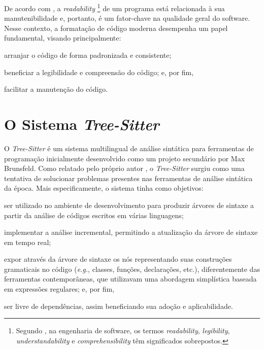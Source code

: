 \documentclass[11pt, a4paper, english, openright, twoside, brazil]{abntex2}
\begin{document}
  De acordo com \textcite{buse-2009-learning}, a \textit{readability}%
  \footnote
    { Segundo \textcite{oliveira-2020-evaluating}, na engenharia de software,
      os termos \textit{readability}, \textit{legibility},
      \textit{understandability} e \textit{comprehensibility} têm significados
      sobrepostos.}
  de um programa está relacionada à sua manutenibilidade e, portanto, é um
  fator-chave na qualidade geral do software.
  Nesse contexto, a formatação de código moderna desempenha um papel
  fundamental, visando principalmente:
  \begin{inparaenum}
    \item arranjar o código de forma padronizada e consistente;
    \item beneficiar a legibilidade e compreensão do código; e, por fim,
    \item facilitar a manutenção do código.
  \end{inparaenum}


  \chapter{O Sistema \textit{Tree-Sitter}}

  O \textit{Tree-Sitter} é um sistema multilingual de análise sintática para
  ferramentas de programação inicialmente desenvolvido como um projeto
  secundário por Max Brunsfeld. Como relatado pelo próprio autor
  \cite{github-2017-tree}, o \textit{Tree-Sitter} surgiu como uma tentativa de
  solucionar problemas presentes nas ferramentas de análise sintática da época.
  Mais especificamente, o sistema tinha como objetivos:
  \begin{inparaenum}
    \item ser utilizado no ambiente de desenvolvimento para produzir árvores de
          sintaxe a partir da análise de códigos escritos em várias linguagens;
    \item implementar a análise incremental, permitindo a atualização da árvore
          de sintaxe em tempo real;
    \item expor através da árvore de sintaxe os nós representando suas
          construções gramaticais no código (\textit{e.g.}, classes, funções,
          declarações, etc.), diferentemente das ferramentas contemporâneas,
          que utilizavam uma abordagem simplística baseada em expressões
          regulares; e, por fim,
    \item ser livre de dependências, assim beneficiando sua adoção e
          aplicabilidade.
  \end{inparaenum}
\end{document}
